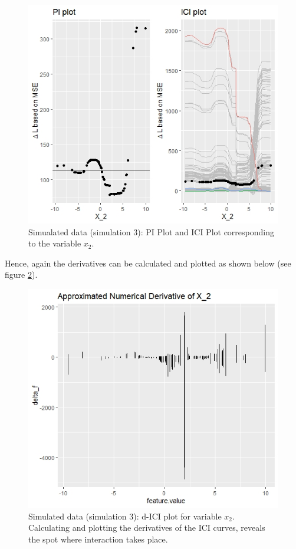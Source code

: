 \documentclass[]{krantz}
\begin{document}
\begin{figure}

{\centering \includegraphics[width=0.99\linewidth]{images/03-7-NL1} 

}

\caption{Simualated data (simulation 3): PI Plot and ICI Plot corresponding to the variable $x_{2}$.}\label{fig:fig7}
\end{figure}

Hence, again the derivatives can be calculated and plotted as shown
below (see figure \ref{fig:fig8}).

\begin{figure}

{\centering \includegraphics[width=0.99\linewidth]{images/03-7-NL2} 

}

\caption{Simulated data (simulation 3): d-ICI plot for variable $x_{2}$. Calculating and plotting the derivatives of the ICI curves, reveals the spot where interaction takes place.}\label{fig:fig8}
\end{figure}
\end{document}
